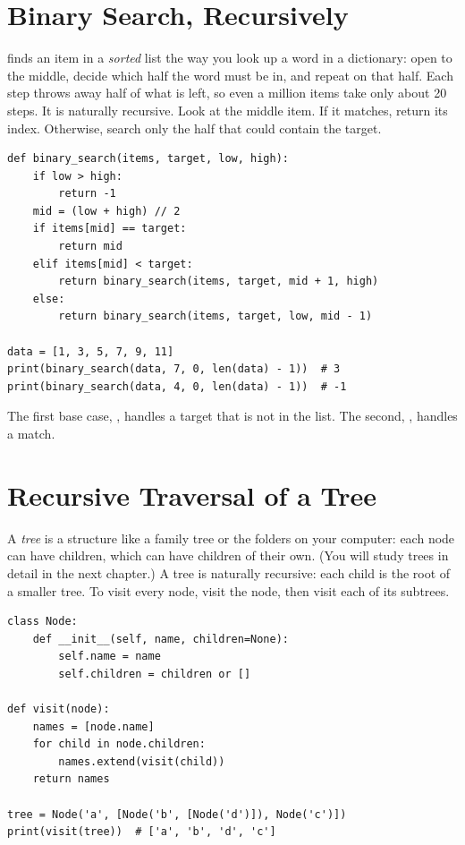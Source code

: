 \section{Binary Search, Recursively}
 finds an item in a \emph{sorted} list the way you
look up a word in a dictionary: open to the middle, decide which half the
word must be in, and repeat on that half. Each step throws away half of
what is left, so even a million items take only about 20 steps. It is
naturally recursive. Look at the middle item. If it matches, return its
index. Otherwise, search only the half that could contain the target.

\begin{verbatim}
def binary_search(items, target, low, high):
    if low > high:
        return -1
    mid = (low + high) // 2
    if items[mid] == target:
        return mid
    elif items[mid] < target:
        return binary_search(items, target, mid + 1, high)
    else:
        return binary_search(items, target, low, mid - 1)

data = [1, 3, 5, 7, 9, 11]
print(binary_search(data, 7, 0, len(data) - 1))  # 3
print(binary_search(data, 4, 0, len(data) - 1))  # -1
\end{verbatim}

The first base case, , handles a target that is not in the
list. The second, , handles a match.

\section{Recursive Traversal of a Tree}
A \emph{tree} is a structure like a family tree or the folders on your
computer: each node can have children, which can have children of their
own. (You will study trees in detail in the next chapter.) A tree is
naturally recursive: each child is the root of a smaller tree. To visit every node, visit the node, then visit each of its
subtrees.

\begin{verbatim}
class Node:
    def __init__(self, name, children=None):
        self.name = name
        self.children = children or []

def visit(node):
    names = [node.name]
    for child in node.children:
        names.extend(visit(child))
    return names

tree = Node('a', [Node('b', [Node('d')]), Node('c')])
print(visit(tree))  # ['a', 'b', 'd', 'c']
\end{verbatim}

